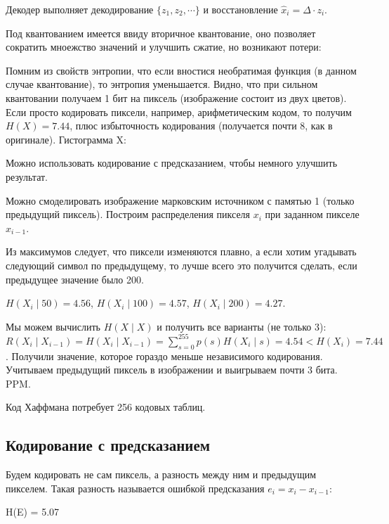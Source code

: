 {Декодер выполняет декодирование $\{z_1, z_2, \cdots \}$ и восстановление $\hat
x_i = \Delta \cdot z_i$.

Под квантованием имеется ввиду вторичное квантование, оно позволяет сократить
мноежство значений и улучшить сжатие, но возникают потери:


Помним из свойств энтропии, что если вностися необратимая функция (в данном
случае квантование), то энтропия уменьшается. Видно, что при сильном
квантовании получаем 1 бит на пиксель (изображение состоит из двух цветов).
Если просто кодировать пиксели, например, арифметическим кодом, то получим
$H(X) = 7.44$, плюс избыточность кодирования (получается почти 8, как в
оригинале). Гистограмма X:


Можно использовать кодирование с предсказанием, чтобы немного улучшить
результат.

Можно смоделировать изображение марковским источником с памятью 1 (только
предыдущий пиксель). Построим распределения пикселя $x_i$ при заданном пикселе
$x_{i-1}$.


Из максимумов следует, что пиксели изменяются плавно, а если хотим угадывать
следующий символ по предыдущему, то лучше всего это получится сделать, если
предыдущее значение было 200.

$H(X_i \mid 50) = 4.56$, $H(X_i \mid 100) = 4.57$, $H(X_i \mid 200) = 4.27$.

Мы можем вычислить $H(X \mid X)$ и получить все варианты (не только 3): $R(X_i
\mid X_{i-1}) = H(X_i \mid X_{i-1}) = \sum_{s=0}^{255} p(s) H(X_i \mid s) =
4.54 < H(X_i) = 7.44$. Получили значение, которое гораздо меньше независимого
кодирования. Учитываем предыдущий пиксель в изображении и выигрываем почти 3
бита. PPM.

Код Хаффмана потребует 256 кодовых таблиц.

\subsection{Кодирование с предсказанием}

Будем кодировать не сам пиксель, а разность между ним и предыдущим пикселем.
Такая разность называется ошибкой предсказания $e_i = x_i - x_{i-1}$:


H(E) = 5.07

}
